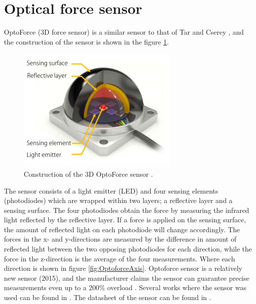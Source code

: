 \documentclass[USenglish]{ifimaster}  %
\begin{document}
\section{Optical force sensor}
OptoForce (3D force sensor) \cite{Optoforce} is a similar sensor to that of Tar and Cserey \cite{6027100}, and the construction of the sensor is shown in the figure \ref{fig:OptoforceBuild}. 

\begin{figure}[h]
	\centering
	\includegraphics[scale=0.8]{Figures/OptoforceBuild}
	\caption[Construction of the 3D OptoForce sensor]{Construction of the 3D OptoForce sensor \cite{OptoforceFig}.}
	\label{fig:OptoforceBuild}
\end{figure}
\FloatBarrier

The sensor consists of a light emitter (LED) and four sensing elements (photodiodes) which are wrapped within two layers; a reflective layer and a sensing surface. The four photodiodes obtain the force by measuring the infrared light reflected by the reflective layer. If a force is applied on the sensing surface, the amount of reflected light on each photodiode will change accordingly. The forces in the x- and y-directions are measured by the difference in amount of reflected light between the two opposing photodiodes for each direction, while the force in the z-direction is the average of the four measurements. Where each direction is shown in figure \ref{fig:OptoforceAxis}. Optoforce sensor is a relatively new sensor (2015), and the manufacturer claims the sensor can guarantee precise measurements even up to a 200\% overload \cite{Optoforce2}. Several works where the sensor was used can be found in \cite{7803326,7759112,7849467}. The datasheet of the sensor can be found in \cite{OptoforceSheet}.
\end{document}
